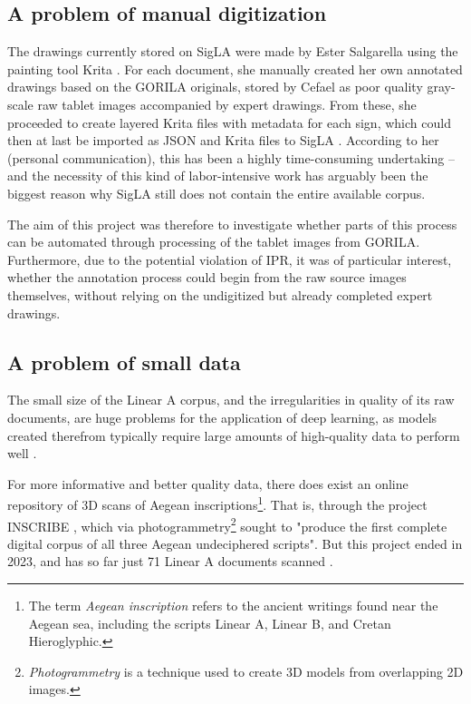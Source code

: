 \subsection{A problem of manual digitization}

The drawings currently stored on SigLA were made by Ester Salgarella using the painting tool Krita \parencite{KritaDocs}.
For each document, she manually created her own annotated drawings based on the \acs{GORILA} originals, stored by \acs{Cefael} as poor quality gray-scale raw tablet images accompanied by expert drawings.
From these, she proceeded to create layered Krita files with metadata for each sign, which could then at last be imported as JSON and Krita files to SigLA \parencite{SalgarellaCastellanSigLA2020}.
According to her (personal communication), this has been a highly time-consuming undertaking -- and the necessity of this kind of labor-intensive work has arguably been the biggest reason why SigLA still does not contain the entire available corpus.


The aim of this project was therefore to investigate whether parts of this process can be automated through processing of the tablet images from \acs{GORILA}.
Furthermore, due to the potential violation of \acf{IPR}, it was of particular interest, whether the annotation process could begin from the raw source images themselves, without relying on the undigitized but already completed expert drawings.

\subsection{A problem of small data}
The small size of the Linear A corpus, and the irregularities in quality of its raw documents, are huge problems for the application of deep learning, as models created therefrom typically require large amounts of high-quality data to perform well \parencite{Goodfellow2016,DataCentricAI}.

For more informative and better quality data, there does exist an online repository of 3D scans of Aegean inscriptions\footnote{The term \textit{Aegean inscription} refers to the ancient writings found near the Aegean sea, including the scripts Linear A, Linear B, and Cretan Hieroglyphic.}.
That is, through the project INSCRIBE \parencite{INSCRIBE3D}, which via photogrammetry\footnote{\textit{Photogrammetry} is a technique used to create 3D models from overlapping 2D images.} sought to "produce the first complete digital corpus of all three Aegean undeciphered scripts".
But this project ended in 2023, and has so far just 71 Linear A documents scanned \parencite{INSCRIBE3DViewer}.

